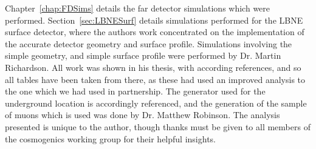 \begin{declaration}
  Chapter~\ref{chap:FDSims} details the far detector simulations which were performed. Section~\ref{sec:LBNESurf} details simulations performed for the LBNE surface detector, where the authors work concentrated on the implementation of the accurate detector geometry and surface profile. Simulations involving the simple geometry, and simple surface profile were performed by Dr. Martin Richardson. All work was shown in his thesis, with according references, and so all tables have been taken from there, as these had used an improved analysis to the one which we had used in partnership. The generator used for the underground location is accordingly referenced, and the generation of the sample of muons which is used was done by Dr. Matthew Robinson. The analysis presented is unique to the author, though thanks must be given to all members of the cosmogenics working group for their helpful insights. \\
  

\end{declaration}


